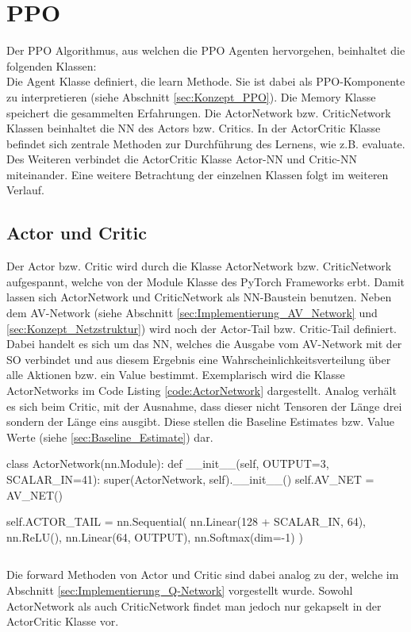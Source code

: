 \section{PPO}
Der PPO Algorithmus, aus welchen die PPO Agenten hervorgehen, beinhaltet die folgenden Klassen:\\
Die Agent Klasse definiert, die learn Methode.  Sie ist dabei als PPO-Komponente zu interpretieren (siehe Abschnitt \ref{sec:Konzept_PPO}).
Die Memory Klasse speichert die gesammelten Erfahrungen.
Die ActorNetwork bzw. CriticNetwork Klassen beinhaltet die NN des Actors bzw. Critics.
In der ActorCritic Klasse befindet sich zentrale Methoden zur Durchführung des Lernens, wie z.B. evaluate. Des Weiteren verbindet die ActorCritic Klasse Actor-NN und Critic-NN miteinander. Eine weitere Betrachtung der einzelnen Klassen folgt im weiteren Verlauf.

\subsection{Actor und Critic}
Der Actor bzw. Critic wird durch die Klasse ActorNetwork bzw. CriticNetwork aufgespannt, welche von der Module Klasse des PyTorch Frameworks erbt. Damit lassen sich ActorNetwork und CriticNetwork als NN-Baustein benutzen.
Neben dem AV-Network (siehe Abschnitt \ref{sec:Implementierung_AV_Network} und \ref{sec:Konzept_Netzstruktur}) wird noch der Actor-Tail bzw. Critic-Tail definiert. Dabei handelt es sich um das NN, welches die Ausgabe vom AV-Network mit der SO verbindet und aus diesem Ergebnis eine Wahrscheinlichkeitsverteilung über alle Aktionen bzw. ein Value bestimmt. 
Exemplarisch wird die Klasse ActorNetworks im Code Listing \ref{code:ActorNetwork} dargestellt. Analog verhält es sich beim Critic, mit der Ausnahme, dass dieser nicht Tensoren der Länge drei sondern der Länge eins ausgibt. Diese stellen die Baseline Estimates bzw. Value Werte (siehe \ref{sec:Baseline_Estimate}) dar.
\begin{python}
class ActorNetwork(nn.Module):
	def __init__(self, OUTPUT=3, SCALAR_IN=41):
		super(ActorNetwork, self).__init__()
		self.AV_NET = AV_NET()
			
		self.ACTOR_TAIL = nn.Sequential(
			nn.Linear(128 + SCALAR_IN, 64),
			nn.ReLU(),
			nn.Linear(64, OUTPUT),
			nn.Softmax(dim=-1)
		)
\end{python}
\begin{lstlisting}[caption=ActorNetwork, label=code:ActorNetwork]
\end{lstlisting}
Die forward Methoden von Actor und Critic sind dabei analog zu der, welche im Abschnitt \ref{sec:Implementierung_Q-Network} vorgestellt wurde. 
Sowohl ActorNetwork als auch CriticNetwork findet man jedoch nur gekapselt in der ActorCritic Klasse vor.

